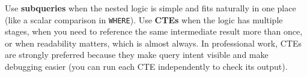 \documentclass[
  letterpaper,
  DIV=11,
  numbers=noendperiod]{scrreprt}
\begin{document}
\begin{tcolorbox}[enhanced jigsaw, opacitybacktitle=0.6, arc=.35mm, colback=white, bottomtitle=1mm, opacityback=0, toprule=.15mm, left=2mm, colbacktitle=quarto-callout-tip-color!10!white, breakable, coltitle=black, toptitle=1mm, colframe=quarto-callout-tip-color-frame, bottomrule=.15mm, titlerule=0mm, title=\textcolor{quarto-callout-tip-color}{\faLightbulb}\hspace{0.5em}{CTEs vs.~Subqueries}, rightrule=.15mm, leftrule=.75mm]

Use \textbf{subqueries} when the nested logic is simple and fits
naturally in one place (like a scalar comparison in \texttt{WHERE}). Use
\textbf{CTEs} when the logic has multiple stages, when you need to
reference the same intermediate result more than once, or when
readability matters, which is almost always. In professional work, CTEs
are strongly preferred because they make query intent visible and make
debugging easier (you can run each CTE independently to check its
output).

\end{tcolorbox}
\end{document}
